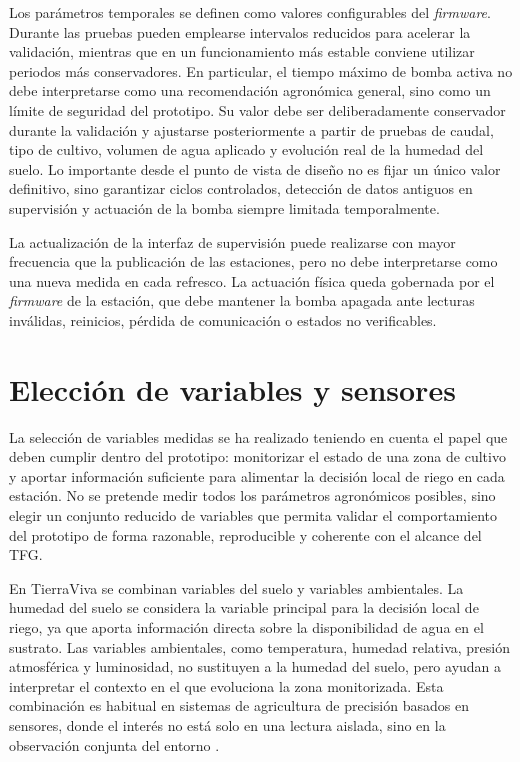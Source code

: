 Los parámetros temporales se definen como valores configurables del \textit{firmware}. Durante las pruebas pueden emplearse intervalos reducidos para acelerar la validación, mientras que en un funcionamiento más estable conviene utilizar periodos más conservadores. En particular, el tiempo máximo de bomba activa no debe interpretarse como una recomendación agronómica general, sino como un límite de seguridad del prototipo. Su valor debe ser deliberadamente conservador durante la validación y ajustarse posteriormente a partir de pruebas de caudal, tipo de cultivo, volumen de agua aplicado y evolución real de la humedad del suelo. Lo importante desde el punto de vista de diseño no es fijar un único valor definitivo, sino garantizar ciclos controlados, detección de datos antiguos en supervisión y actuación de la bomba siempre limitada temporalmente.

La actualización de la interfaz de supervisión puede realizarse con mayor frecuencia que la publicación de las estaciones, pero no debe interpretarse como una nueva medida en cada refresco. La actuación física queda gobernada por el \textit{firmware} de la estación, que debe mantener la bomba apagada ante lecturas inválidas, reinicios, pérdida de comunicación o estados no verificables.

\section{Elección de variables y sensores}
\label{sec:eleccion_variables_sensores}

La selección de variables medidas se ha realizado teniendo en cuenta el papel que deben cumplir dentro del prototipo: monitorizar el estado de una zona de cultivo y aportar información suficiente para alimentar la decisión local de riego en cada estación. No se pretende medir todos los parámetros agronómicos posibles, sino elegir un conjunto reducido de variables que permita validar el comportamiento del prototipo de forma razonable, reproducible y coherente con el alcance del TFG.

En TierraViva se combinan variables del suelo y variables ambientales. La humedad del suelo se considera la variable principal para la decisión local de riego, ya que aporta información directa sobre la disponibilidad de agua en el sustrato. Las variables ambientales, como temperatura, humedad relativa, presión atmosférica y luminosidad, no sustituyen a la humedad del suelo, pero ayudan a interpretar el contexto en el que evoluciona la zona monitorizada. Esta combinación es habitual en sistemas de agricultura de precisión basados en sensores, donde el interés no está solo en una lectura aislada, sino en la observación conjunta del entorno \cite{soussi2024smart}.

